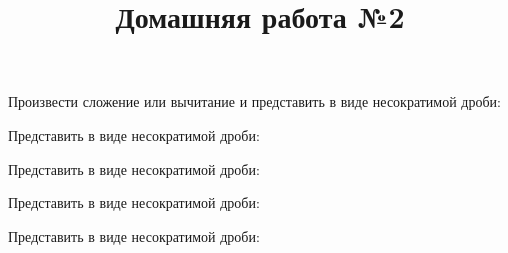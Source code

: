 \newpage
\title{Домашняя работа №2}
\begin{listofex}
	\item Произвести сложение или вычитание и представить в виде несократимой дроби:
	\begin{enumcols}[itemcolumns=2]
		\item {}
		\item {}
		\item {}
		\item {}
	\end{enumcols}
	\item Представить в виде несократимой дроби:
	\begin{enumcols}[itemcolumns=2]
		\item {}
		\item {}
		\item {}
		\item {}
		\item {}
		\item {}
		\item {}
	\end{enumcols}
	\item Представить в виде несократимой дроби:
	\begin{enumcols}[itemcolumns=2]
		\item {}
		\item {}
		\item {}
		\item {}
		\item {}
	\end{enumcols}
	\item Представить в виде несократимой дроби:
	\begin{enumcols}[itemcolumns=2]
		\item {}
		\item {}
		\item {}
		\item {}
	\end{enumcols}
	\item Представить в виде несократимой дроби:
	\begin{enumcols}[itemcolumns=2]
		\item {}
		\item {}
		\item {}
		\item {}
		\item {}
		\item {}
		\item {}
	\end{enumcols}
\end{listofex}
